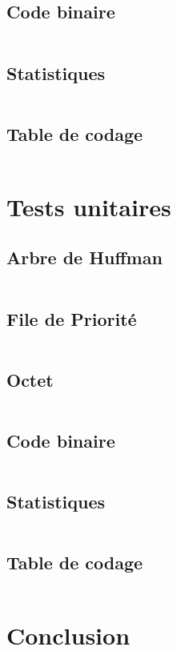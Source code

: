 \documentclass[12pt,a4paper]{article}
\begin{document}
\subsection{Code binaire}
    \inputminted[breaklines]{c}{../code/src/codeBinaire.c}
\subsection{Statistiques}
    \inputminted[breaklines]{c}{../code/src/stats.c}
\subsection{Table de codage}
    \inputminted[breaklines]{c}{../code/src/table.c}

\newpage

\section{Tests unitaires}
\subsection{Arbre de Huffman}
    \inputminted[breaklines]{c}{../code/src/tests/testArbre.c}
\subsection{File de Priorité}
    \inputminted[breaklines]{c}{../code/src/tests/testFile.c}
\subsection{Octet}
    \inputminted[breaklines]{c}{../code/src/tests/testOctet.c}
\subsection{Code binaire}
    \inputminted[breaklines]{c}{../code/src/tests/testCodeBinaire.c}
\subsection{Statistiques}
    \inputminted[breaklines]{c}{../code/src/tests/testStats.c}
\subsection{Table de codage}
    \inputminted[breaklines]{c}{../code/src/tests/testTable.c}

\newpage

\section{Conclusion}


\end{document}

